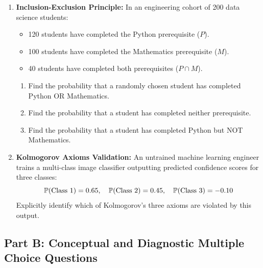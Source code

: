 \begin{enumerate}
    \item \textbf{Inclusion-Exclusion Principle:} In an engineering cohort of 200 data science students:
    \begin{itemize}
        \item 120 students have completed the Python prerequisite ($P$).
        \item 100 students have completed the Mathematics prerequisite ($M$).
        \item 40 students have completed both prerequisites ($P \cap M$).
    \end{itemize}
    \begin{enumerate}
        \item Find the probability that a randomly chosen student has completed Python OR Mathematics.
        \item Find the probability that a student has completed neither prerequisite.
        \item Find the probability that a student has completed Python but NOT Mathematics.
    \end{enumerate}

    \item \textbf{Kolmogorov Axioms Validation:} An untrained machine learning engineer trains a multi-class image classifier outputting predicted confidence scores for three classes:
    $$\P(\text{Class 1}) = 0.65, \quad \P(\text{Class 2}) = 0.45, \quad \P(\text{Class 3}) = -0.10$$
    Explicitly identify which of Kolmogorov's three axioms are violated by this output.
\end{enumerate}

\subsection*{Part B: Conceptual and Diagnostic Multiple Choice Questions}

